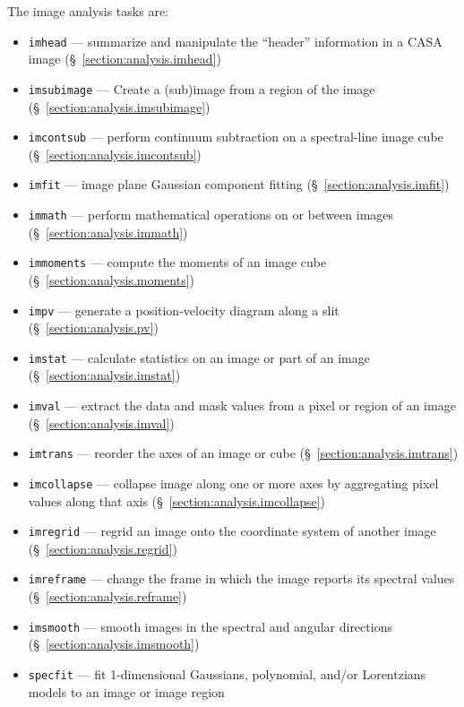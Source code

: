 The image analysis tasks are:
\begin{itemize}
   \item {\tt imhead} --- summarize and manipulate the ``header'' 
         information in a CASA image 
         (\S~\ref{section:analysis.imhead})
   \item {\tt imsubimage} --- Create a (sub)image from a region of the
     image (\S~\ref{section:analysis.imsubimage}) 
   \item {\tt imcontsub} --- perform continuum subtraction on a
         spectral-line image cube 
         (\S~\ref{section:analysis.imcontsub})
   \item {\tt imfit} --- image plane Gaussian component fitting
         (\S~\ref{section:analysis.imfit})
   \item {\tt immath} --- perform mathematical operations on or
         between images
         (\S~\ref{section:analysis.immath})
   \item {\tt immoments} --- compute the moments of an image cube
         (\S~\ref{section:analysis.moments})
    \item {\tt impv} --- generate a position-velocity diagram along a slit
         (\S~\ref{section:analysis.pv})
   \item {\tt imstat} --- calculate statistics on an image or part
         of an image
         (\S~\ref{section:analysis.imstat})
   \item {\tt imval} --- extract the data and mask values from a
         pixel or region of an image
         (\S~\ref{section:analysis.imval})
  \item {\tt imtrans} --- reorder the axes of an image or cube
         (\S~\ref{section:analysis.imtrans})
  \item {\tt imcollapse} --- collapse image along one or more axes by aggregating pixel values along that axis 
         (\S~\ref{section:analysis.imcollapse})
   \item {\tt imregrid} --- regrid an image onto the coordinate
         system of another image 
         (\S~\ref{section:analysis.regrid})
   \item {\tt imreframe} --- change the frame in which the image
     reports its spectral values
         (\S~\ref{section:analysis.reframe})
   \item {\tt imsmooth} --- smooth images in the spectral and angular
     directions
         (\S~\ref{section:analysis.imsmooth})
   \item{\tt specfit} --- fit 1-dimensional Gaussians, 
     polynomial, and/or Lorentzians models to an image or image region 

\end{itemize}
